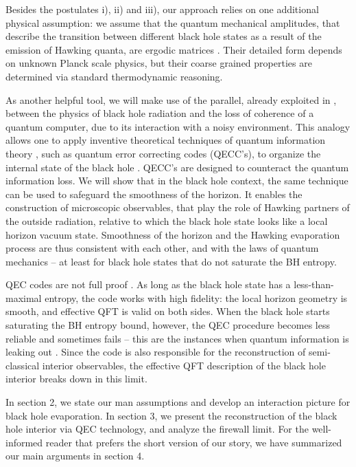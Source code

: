 \documentclass[12pt]{article}%
\begin{document}
Besides the postulates i), ii) and iii), our approach relies on one additional physical assumption: we assume that
 the quantum mechanical amplitudes, that describe the transition between different black hole states as a result of the emission of Hawking quanta,
 are ergodic matrices \cite{fastscrambler}. Their detailed form depends on unknown Planck  scale physics,  but their coarse grained properties are determined via standard
 thermodynamic reasoning. 
 
 As another helpful tool,  we will make use of the parallel, already exploited in \cite{haydenpreskill}, between the physics of black hole radiation
and  the loss of coherence of a quantum computer, due to its interaction with a noisy environment. 
This analogy allows one to apply inventive
theoretical techniques of quantum information theory \cite{quantuminformation, preskilllectures}, such as quantum error correcting codes (QECC's), to organize
the internal state of the black hole \cite{haydenpreskill}.
QECC's are designed to counteract  the quantum information loss.  We will show that in the black hole context,  the same technique
can be used to safeguard the smoothness of the horizon. It enables the construction of microscopic observables, that play the role of Hawking partners
of the outside radiation, relative to which the black hole state looks like a local horizon vacuum state. 
Smoothness of the horizon and the Hawking evaporation process are thus consistent with each other, and with the laws of quantum mechanics --
 at least for black hole states that do not saturate the BH entropy.

QEC codes are not full proof \cite{preskilllectures}. 
As long as the black hole state has a less-than-maximal entropy, the code works with high fidelity:
the local horizon geometry is smooth, and effective QFT is valid on both sides. When the black hole starts saturating the BH entropy bound, however,
the QEC procedure becomes less reliable and sometimes fails  -- this are the instances when quantum information 
is leaking out \cite{haydenpreskill}. Since the code is also responsible for the reconstruction of 
semi-classical interior observables,  the effective QFT description of the black hole interior breaks down in this limit.
 
In section 2, we state our man assumptions and develop an interaction picture  for black hole evaporation.
In section 3, we present the reconstruction of the black hole interior via QEC technology, and analyze the firewall limit.
For the well-informed reader that prefers the short version of our story, we have summarized our main arguments in section 4.
\end{document}
